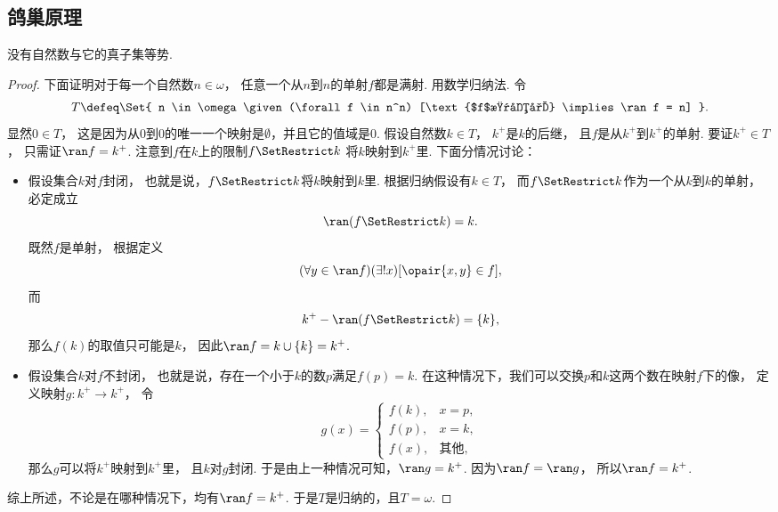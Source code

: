 \subsection{鸽巢原理}
\begin{theorem}\label{theorem:集合论.鸽巢原理}
没有自然数与它的真子集等势.
\begin{proof}
下面证明对于每一个自然数\(n \in \omega\)，
任意一个从\(n\)到\(n\)的单射\(f\)都是满射.
用数学归纳法.
令\begin{equation*}
	T \defeq \Set{
		n \in \omega
		\given
		(\forall f \in n^n)
		[\text{$f$是单射} \implies \ran f = n]
	}.
\end{equation*}
显然\(0 \in T\)，
这是因为从\(0\)到\(0\)的唯一一个映射是\(\emptyset\)，并且它的值域是\(0\).
假设自然数\(k \in T\)，
\(k^+\)是\(k\)的后继，
且\(f\)是从\(k^+\)到\(k^+\)的单射.
要证\(k^+ \in T\)，
只需证\(\ran f = k^+\).
注意到\(f\)在\(k\)上的限制\(f \SetRestrict k\)
将\(k\)映射到\(k^+\)里.
下面分情况讨论：\begin{itemize}
	\item 假设集合\(k\)对\(f\)封闭，
	也就是说，\(f \SetRestrict k\)将\(k\)映射到\(k\)里.
	根据归纳假设有\(k \in T\)，
	而\(f \SetRestrict k\)作为一个从\(k\)到\(k\)的单射，
	必定成立\begin{equation*}
		\ran(f \SetRestrict k) = k.
	\end{equation*}
	既然\(f\)是单射，
	根据定义\begin{equation*}
		(\forall y \in \ran f)
		(\exists! x)
		[\opair{x,y} \in f],
	\end{equation*}
	而\begin{equation*}
		k^+ - \ran(f \SetRestrict k) = \{k\},
	\end{equation*}
	那么\(f(k)\)的取值只可能是\(k\)，
	因此\(\ran f = k \cup \{k\} = k^+\).

	\item 假设集合\(k\)对\(f\)不封闭，
	也就是说，存在一个小于\(k\)的数\(p\)满足\(f(p) = k\).
	在这种情况下，我们可以交换\(p\)和\(k\)这两个数在映射\(f\)下的像，
	定义映射\(g\colon k^+ \to k^+\)，
	令\begin{equation*}
		g(x) = \left\{ \begin{array}{cl}
			f(k), & x = p, \\
			f(p), & x = k, \\
			f(x), & \text{其他},
		\end{array} \right.
	\end{equation*}
	那么\(g\)可以将\(k^+\)映射到\(k^+\)里，
	且\(k\)对\(g\)封闭.
	于是由上一种情况可知，\(\ran g = k^+\).
	因为\(\ran f = \ran g\)，
	所以\(\ran f = k^+\).
\end{itemize}
综上所述，不论是在哪种情况下，均有\(\ran f = k^+\).
于是\(T\)是归纳的，且\(T = \omega\).
\end{proof}
\end{theorem}


